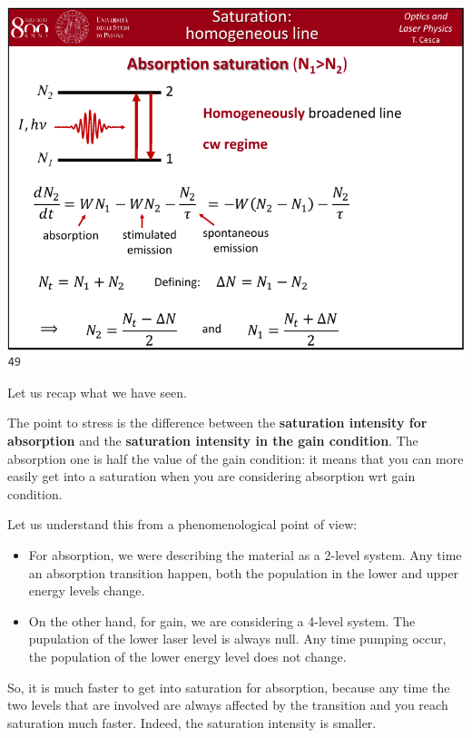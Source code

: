 \documentclass[../main/main.tex]{subfiles}
\begin{document}
\begin{minipage}[]{0.5\linewidth}
\centering
\includegraphics[page=16,width=1\textwidth]{../lessons/pdf_file/10_lecture.pdf}
\end{minipage}
\hspace{0.3cm}\vspace{0.3cm}
\begin{minipage}[c]{0.47\linewidth}

Let us recap what we have seen.

The point to stress is the difference between the \textbf{saturation intensity for absorption} and the \textbf{saturation intensity in the gain condition}. The absorption one is half the value of the gain condition: it means that you can more easily get into a saturation when you are considering absorption wrt gain condition.

\end{minipage}

Let us understand this from a phenomenological point of view:

\begin{itemize}
\item For absorption, we were describing the material as a 2-level system. Any time an absorption transition happen, both the population in the lower and upper energy levels change.

\item On the other hand, for gain, we are considering a 4-level system. The pupulation of the lower laser level is always null. Any time pumping occur, the population of the lower energy level does not change.
\end{itemize}
So, it is much faster to get into saturation for absorption, because any time the two levels that are involved are always affected by the transition and you reach saturation much faster. Indeed, the saturation intensity is smaller.
\end{document}
